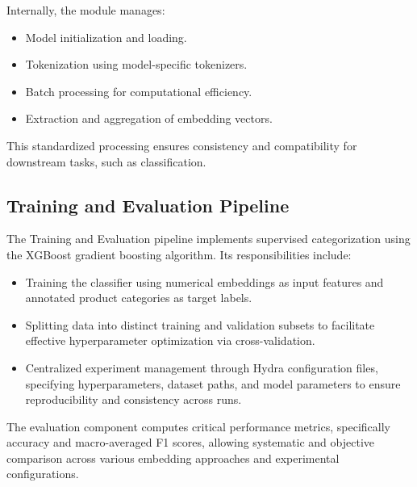 \documentclass{SGGW-thesis-EN}
\begin{document}
Internally, the module manages:

\begin{itemize}
  \item Model initialization and loading.
  \item Tokenization using model-specific tokenizers.
  \item Batch processing for computational efficiency.
  \item Extraction and aggregation of embedding vectors.
\end{itemize}

This standardized processing ensures consistency and compatibility for downstream tasks, such as classification.

\subsection{Training and Evaluation Pipeline}

The Training and Evaluation pipeline implements supervised categorization using the XGBoost gradient boosting algorithm. Its responsibilities include:

\begin{itemize}
  \item Training the classifier using numerical embeddings as input features and annotated product categories as target labels.
  \item Splitting data into distinct training and validation subsets to facilitate effective hyperparameter optimization via cross-validation.
  \item Centralized experiment management through Hydra configuration files, specifying hyperparameters, dataset paths, and model parameters to ensure  
  reproducibility and consistency across runs.
\end{itemize}

The evaluation component computes critical performance metrics, specifically accuracy and macro-averaged F1 scores, allowing systematic and objective  
comparison across various embedding approaches and experimental configurations.
\end{document}
